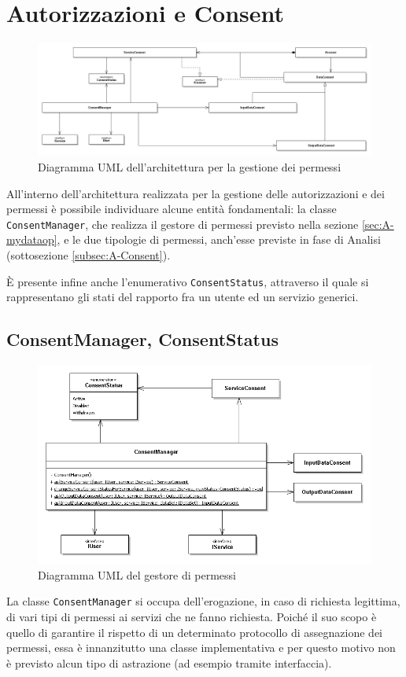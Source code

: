 \section{Autorizzazioni e Consent}
\label{sec:P-AutorizzazioniEConsent}
\begin{figure} [h]
\includegraphics[width=\linewidth]{pictures/Auth-closed.png}
\caption{Diagramma UML dell'architettura per la gestione dei permessi}
\label{fig:Auth-closed}
\end{figure}
All'interno dell'architettura realizzata per la gestione delle autorizzazioni e dei permessi \`e possibile individuare alcune entit\`a fondamentali: la classe \texttt{ConsentManager}, che realizza il gestore di permessi previsto nella sezione \ref{sec:A-mydataop}, e le due tipologie di permessi, anch’esse previste in fase di Analisi (sottosezione \ref{subsec:A-Consent}).

\`E presente infine anche l’enumerativo \texttt{ConsentStatus}, attraverso il quale si rappresentano gli stati del rapporto fra un utente ed un servizio generici.

\subsection{ConsentManager, ConsentStatus}
\label{subsec:P-CMConsStatus}
\begin{figure} [h]
	\includegraphics[width=\linewidth]{pictures/Auth-CM.png}
	\caption{Diagramma UML del gestore di permessi}
	\label{fig:Auth-CM}
\end{figure}
La classe \texttt{ConsentManager} si occupa dell’erogazione, in caso di richiesta legittima, di vari tipi di permessi ai servizi che ne fanno richiesta. Poich\'e il suo scopo \`e quello di garantire il rispetto di un determinato protocollo di assegnazione dei permessi, essa \`e innanzitutto una classe implementativa e per questo motivo non \`e previsto alcun tipo di astrazione (ad esempio tramite interfaccia).

